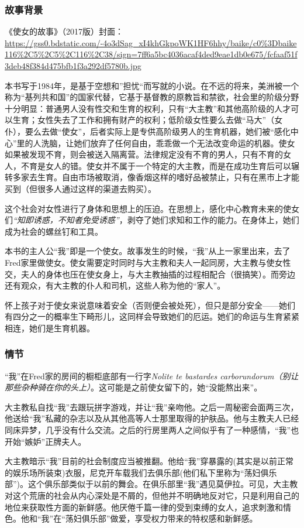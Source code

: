 \subsubsection{故事背景}

《使女的故事》（2017版）封面： \url{https://gss0.bdstatic.com/-4o3dSag_xI4khGkpoWK1HF6hhy/baike/c0\%3Dbaike116\%2C5\%2C5\%2C116\%2C38/sign=7ff6a5bc4036acaf4ded9eae1db0e675/fcfaaf51f3deb48f384d475bfb1f3a292df5780b.jpg}

本书写于1984年，是基于空想和”担忧“而写就的小说。在不远的将来，美洲被一个称为“基列共和国”的国家代替，它基于基督教的原教旨和禁欲，社会里的阶级分野十分明显：普通男人没有性交和生育的权利，只有“大主教”和其他高阶级的人才可以生育；女性失去了工作和拥有财产的权利；低阶级女性要么去做“马大”（女仆），要么去做“使女”，后者实际上是专供高阶级男人的生育机器，她们被“感化中心”里的人洗脑，让她们放弃了任何自由，乖乖做一个无法改变命运的机器。使女如果被发现不育，则会被送入隔离营。法律规定没有不育的男人，只有不育的女人，不育是女人的错。使女并不属于一个特定的大主教，而是在成功生育后可以辗转多家去生育。自由市场被取消，像香烟这样的嗜好品被禁止，只有在黑市上才能买到（但很多人通过这样的渠道去购买）。

这个社会对女性进行了身体和思想上的压迫。在思想上，感化中心教育未来的使女们\emph{“知即诱惑，不知者免受诱惑”}，剥夺了她们求知和工作的能力。在身体上，她们成为社会的螺丝钉和工具。

本书的主人公“我”即是一个使女。故事发生的时候，“我”从上一家里出来，去了Fred家里做使女。使女需要定时同时与大主教和夫人一起同房，大主教与使女性交，夫人的身体也压在使女身上，与大主教抽插的过程相配合（很搞笑）。而旁边还有观众，有大主教的仆人和司机，这些人称为他的“家人”。

怀上孩子对于使女来说意味着安全（否则便会被处死），但只是部分安全——她们有四分之一的概率生下畸形儿，这同样会导致她们的厄运。她们的命运与生育紧紧相连，她们是生育机器。

\subsubsection{情节}
“我”在Fred家的房间的橱柜底部有一行字\emph{Nolite te bastardes carborundorum（别让那些杂种骑在你的头上）}。这可能是之前使女留下的，她“没能熬出来”。

大主教私自找“我”去跟玩拼字游戏，并让“我”亲吻他。之后一周秘密会面两三次，他送给“我”私藏的杂志以及从其他高等人士那里取得的护肤品。他与主教夫人已经同床异梦，几乎没有什么交流。之后的行房里两人之间似乎有了一种感情，“我”也开始“嫉妒”正牌夫人。

大主教暗示“我”目前的社会制度应当被推翻。他给“我”穿暴露的(其实是以前正常的娱乐场所装束)衣服，尼克开车载我们去俱乐部(他们私下里称为“荡妇俱乐部”)。这个俱乐部类似于以前的舞会。在俱乐部里“我”遇见莫伊拉。可见，大主教对这个荒唐的社会从内心深处是不屑的，但他并不明确地反对它，只是利用自己的地位来获取性方面的新鲜感。他厌倦千篇一律的受到束缚的女人，追求刺激和情色。他和“我”在“荡妇俱乐部”做爱，享受权力带来的特权感和新鲜感。

